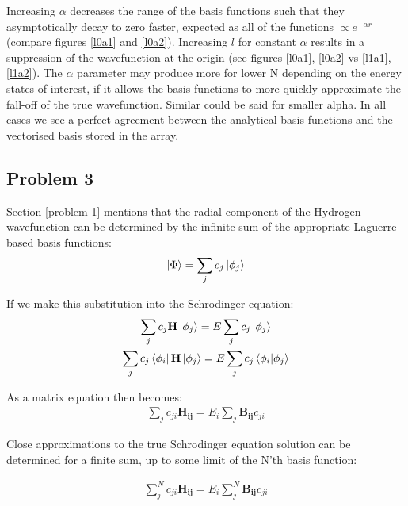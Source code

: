 \documentclass{article}
\renewcommand{\vec}[1]{\mathbf{#1}}
\begin{document}
    Increasing $\alpha$ decreases the range of the basis functions such that they asymptotically decay to zero faster, expected as all of the functions $\propto e^{-\alpha r}$ (compare figures \ref{l0a1} and \ref{l0a2}). Increasing $l$ for constant $\alpha$ results in a suppression of the wavefunction at the origin (see figures \ref{l0a1}, \ref{l0a2} vs \ref{l1a1}, \ref{l1a2}). The $\alpha$ parameter may produce more for lower N depending on the energy states of interest, if it allows the basis functions to more quickly approximate the fall-off of the true wavefunction. Similar could be said for smaller alpha. In all cases we see a perfect agreement  between the analytical basis functions and the vectorised basis stored in the array.
    
    
    
    
    
    
    \subsection{Problem 3}
    
    
    Section \ref{problem 1} mentions that the radial component of the Hydrogen wavefunction can be determined by the infinite sum of the appropriate Laguerre based basis functions:
    \large
    \begin{gather}
    	\ket{\Phi} = \sum_{j}c_j\ket{\phi_j}
    \end{gather}
    \normalsize
    
    If we make this substitution into the Schrodinger equation:
    \large
    \begin{gather}
    	\sum_{j}c_j\vec{H}\ket{\phi_j} = E\sum_{j}c_j\ket{\phi_j}\\
    	\sum_{j}c_j\bra{\phi_i}\vec{H}\ket{\phi_j} = E\sum_{j}c_j\bra{\phi_i}\ket{\phi_j}
    \end{gather}
    \normalsize
    
    As a matrix equation then becomes:
    \large
    \begin{gather}
    	\sum_{j}c_{ji}\vec{H_{ij}} = E_i\sum_{j}\vec{B_{ij}}c_{ji}
    \end{gather}
    \normalsize


    Close approximations to the true Schrodinger equation solution can be determined for a finite sum, up to some limit of the N'th basis function:
    
	\large
	\begin{gather}
		\sum_{j}^{N}c_{ji}\vec{H_{ij}} = E_i\sum_{j}^{N}\vec{B_{ij}}c_{ji}
	\end{gather}
	\normalsize
	
\end{document}
